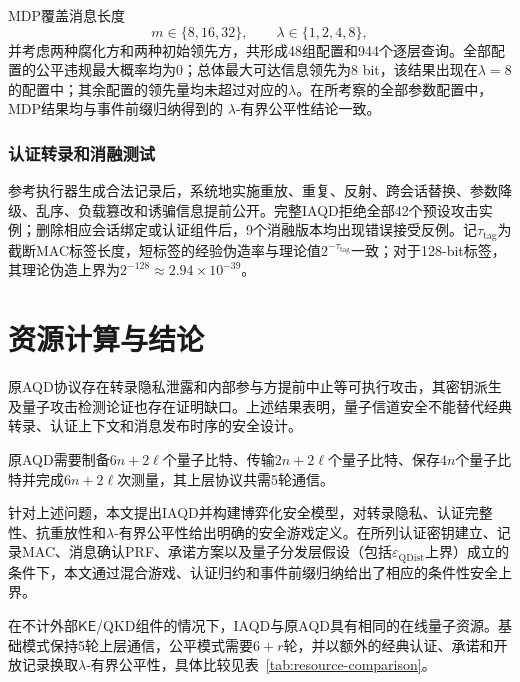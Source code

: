 \documentclass[UTF8,10pt,a4paper]{ctexart}
\theoremstyle{aqdplain}
\begin{document}
MDP覆盖消息长度
\[
m\in\{8,16,32\},
\qquad
\lambda\in\{1,2,4,8\},
\]
并考虑两种腐化方和两种初始领先方，共形成48组配置和944个逐层查询。全部配置的公平违规最大概率均为$0$；总体最大可达信息领先为8 bit，该结果出现在$\lambda=8$的配置中；其余配置的领先量均未超过对应的$\lambda$。在所考察的全部参数配置中，MDP结果均与事件前缀归纳得到的
$\lambda$-有界公平性结论一致。

\subsubsection{认证转录和消融测试}

参考执行器生成合法记录后，系统地实施重放、重复、反射、跨会话替换、参数降级、乱序、负载篡改和诱骗信息提前公开。完整IAQD拒绝全部42个预设攻击实例；删除相应会话绑定或认证组件后，9个消融版本均出现错误接受反例。记$\tau_{\mathrm{tag}}$为截断MAC标签长度，短标签的经验伪造率与理论值$2^{-\tau_{\mathrm{tag}}}$一致；对于128-bit标签，其理论伪造上界为$2^{-128}\approx2.94\times10^{-39}$。



\section{资源计算与结论}
\label{sec:discussion}

原AQD协议存在转录隐私泄露和内部参与方提前中止等可执行攻击，其密钥派生及量子攻击检测论证也存在证明缺口。上述结果表明，量子信道安全不能替代经典转录、认证上下文和消息发布时序的安全设计。

原AQD需要制备$6n+2\ell$个量子比特、传输$2n+2\ell$个量子比特、保存$4n$个量子比特并完成$6n+2\ell$次测量，其上层协议共需5轮通信。

针对上述问题，本文提出IAQD并构建博弈化安全模型，对转录隐私、认证完整性、抗重放性和$\lambda$-有界公平性给出明确的安全游戏定义。在所列认证密钥建立、记录MAC、消息确认PRF、承诺方案以及量子分发层假设（包括$\varepsilon_{\mathrm{QDist}}$上界）成立的条件下，本文通过混合游戏、认证归约和事件前缀归纳给出了相应的条件性安全上界。

在不计外部$\mathsf{KE}$/QKD组件的情况下，IAQD与原AQD具有相同的在线量子资源。基础模式保持5轮上层通信，公平模式需要$6+r$轮，并以额外的经典认证、承诺和开放记录换取$\lambda$-有界公平性，具体比较见表~\ref{tab:resource-comparison}。
\end{document}
